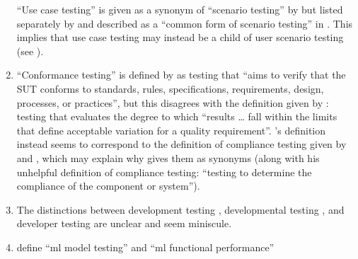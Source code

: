 \begin{enumerate}
          ``Use case testing'' is given as a synonym of ``scenario testing''
          by \citetISTQB{}
          but listed separately by
          \citet[Fig.~2]{IEEE2022} and described as a ``common form of scenario
          testing'' in \citeyearpar[p.~20]{IEEE2021c}.
          This implies that use case testing may instead be a child of
          user scenario testing (see ).
    \item %
          ``Conformance testing'' is defined by \citet[p.~5\=/7]{SWEBOK2024} as
          testing that ``aims to verify that the SUT conforms to standards,
          rules, specifications, requirements, design, processes, or practices'',
          but this disagrees with the definition given by \citet[p.~92]{IEEE2017}%
          : testing that evaluates the degree to which
          ``results \dots{} fall within the limits that define acceptable
          variation for a quality requirement''. \citeauthor{SWEBOK2024}'s
          definition instead seems to correspond to the definition of compliance
          testing given by \citetISTQB{} and
          \citet[p.~33]{Firesmith2015}, which may explain why
          \citet[p.~43]{Kam2008} gives them as synonyms (along with his
          unhelpful definition of compliance testing: ``testing to determine
          the compliance of the component or system'').
    \item %
          The distinctions between development testing \citep[p.~136]{IEEE2017},
          developmental testing \citep[p.~30]{Firesmith2015}, and developer
          testing \citep[p.~39;][p.~11]{Gerrard2000a} are unclear and seem
          miniscule.
    \item %
          \citetISTQB{} define
          ``\acf{ml} model testing'' and ``\acs{ml} functional performance''

\end{enumerate}
